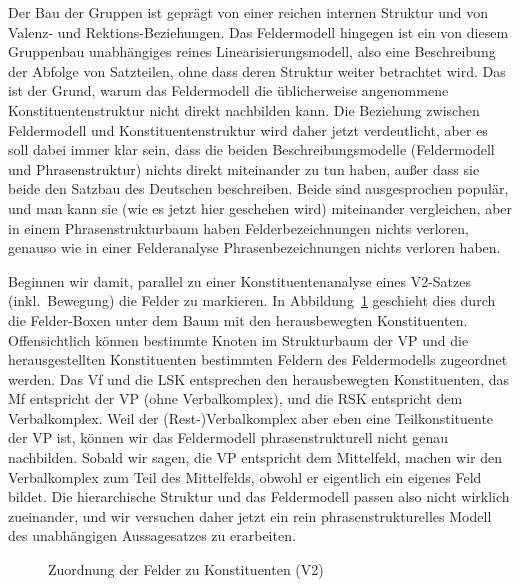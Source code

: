 Der Bau der Gruppen ist geprägt von einer reichen internen Struktur und von Valenz- und Rektions-Beziehungen.
Das Feldermodell hingegen ist ein von diesem Gruppenbau unabhängiges reines Linearisierungsmodell, also eine Beschreibung der Abfolge von Satzteilen, ohne dass deren Struktur weiter betrachtet wird.
Das ist der Grund, warum das Feldermodell die üblicherweise angenommene Konstituentenstruktur nicht direkt nachbilden kann.
Die Beziehung zwischen Feldermodell und Konstituentenstruktur wird daher jetzt verdeutlicht, aber es soll dabei immer klar sein, dass die beiden Beschreibungsmodelle (Feldermodell und Phrasenstruktur) nichts direkt miteinander zu tun haben, außer dass sie beide den Satzbau des Deutschen beschreiben.
Beide sind ausgesprochen populär, und man kann sie (wie es jetzt hier geschehen wird) miteinander vergleichen, aber in einem Phrasenstrukturbaum haben Felderbezeichnungen nichts verloren, genauso wie in einer Felderanalyse Phrasenbezeichnungen nichts verloren haben.

Beginnen wir damit, parallel zu einer Konstituentenanalyse eines V2-Satzes (inkl.\ Bewegung) die Felder zu markieren.
In Abbildung~\ref{fig:movev2konstituenten} geschieht dies durch die Felder-Boxen unter dem Baum mit den herausbewegten Konstituenten.
Offensichtlich können bestimmte Knoten im Strukturbaum der VP und die herausgestellten Konstituenten bestimmten Feldern des Feldermodells zugeordnet werden.
Das Vf und die LSK entsprechen den herausbewegten Konstituenten, das Mf entspricht der VP (ohne Verbalkomplex), und die RSK entspricht dem Verbalkomplex.
Weil der (Rest-)Verbalkomplex aber eben eine Teilkonstituente der VP ist, können wir das Feldermodell phrasenstrukturell nicht genau nachbilden.
Sobald wir sagen, die VP entspricht dem Mittelfeld, machen wir den Verbalkomplex zum Teil des Mittelfelds, obwohl er eigentlich ein eigenes Feld bildet.
Die hierarchische Struktur und das Feldermodell passen also nicht wirklich zueinander, und wir versuchen daher jetzt ein rein phrasenstrukturelles Modell des unabhängigen Aussagesatzes zu erarbeiten.

\begin{figure}
  \caption{Zuordnung der Felder zu Konstituenten (V2)}
  \label{fig:movev2konstituenten}
\end{figure}

